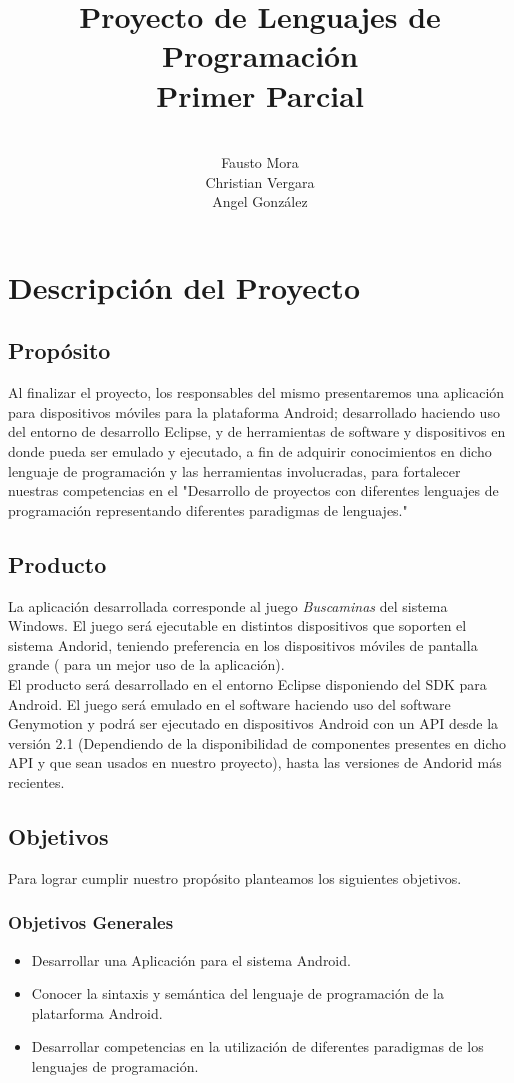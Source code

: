 \documentclass[11pt,a4paper,spanish]{article} %
\title{Proyecto de Lenguajes de Programaci\'on \\ Primer Parcial}
\author{\\Fausto Mora \\Christian Vergara \\ Angel Gonz\'alez}
\begin{document}
\maketitle

\newpage
\thispagestyle{empty}
\tableofcontents

\newpage
\thispagestyle{empty}

\section{Descripci\'on del Proyecto}
\subsection{Prop\'osito}
Al finalizar el proyecto, los responsables del mismo presentaremos una aplicaci\'on para dispositivos m\'oviles para la plataforma Android; desarrollado haciendo uso del entorno de desarrollo Eclipse, y de herramientas de software y dispositivos en donde pueda ser emulado y ejecutado, a fin de adquirir conocimientos en dicho lenguaje de programaci\'on y las herramientas involucradas, para fortalecer nuestras competencias en el "Desarrollo de proyectos con diferentes lenguajes de programaci\'on representando diferentes paradigmas de lenguajes."
\subsection{Producto}
La aplicaci\'on desarrollada corresponde al juego \textsl{Buscaminas} del sistema Windows. El juego será ejecutable en distintos dispositivos que soporten el sistema Andorid, teniendo preferencia en los dispositivos m\'oviles de pantalla grande ( para un mejor uso de la aplicaci\'on).
\\El producto ser\'a desarrollado en el entorno Eclipse disponiendo del SDK para Android. El juego ser\'a emulado en el software haciendo uso del software Genymotion y podr\'a ser ejecutado en dispositivos Android con un API desde la versi\'on 2.1 (Dependiendo de la disponibilidad de componentes presentes en dicho API y que sean usados en nuestro proyecto), hasta las versiones de Andorid m\'as recientes.
\subsection{Objetivos}
Para lograr cumplir nuestro prop\'osito planteamos los siguientes objetivos.
\subsubsection{Objetivos Generales}
\begin{itemize}
\item Desarrollar una Aplicaci\'on para el sistema Android.
\item Conocer la sintaxis y sem\'antica del lenguaje de programaci\'on de la platarforma Android.
\item Desarrollar competencias en la utilizaci\'on de diferentes paradigmas de los lenguajes de programaci\'on.
\end{itemize}
\end{document}
